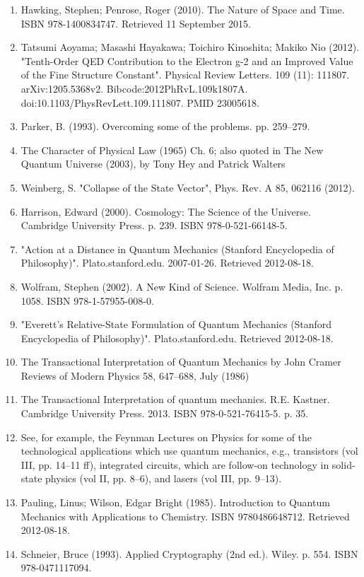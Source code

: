 \begin{enumerate}
\item Hawking, Stephen; Penrose, Roger (2010). The Nature of Space and Time. ISBN 978-1400834747. Retrieved 11 September 2015.
\item Tatsumi Aoyama; Masashi Hayakawa; Toichiro Kinoshita; Makiko Nio (2012). "Tenth-Order QED Contribution to the Electron g-2 and an Improved Value of the Fine Structure Constant". Physical Review Letters. 109 (11): 111807. arXiv:1205.5368v2. Bibcode:2012PhRvL.109k1807A. doi:10.1103/PhysRevLett.109.111807. PMID 23005618.
\item Parker, B. (1993). Overcoming some of the problems. pp. 259–279.
\item The Character of Physical Law (1965) Ch. 6; also quoted in The New Quantum Universe (2003), by Tony Hey and Patrick Walters
\item Weinberg, S. "Collapse of the State Vector", Phys. Rev. A 85, 062116 (2012).
\item Harrison, Edward (2000). Cosmology: The Science of the Universe. Cambridge University Press. p. 239. ISBN 978-0-521-66148-5.
\item "Action at a Distance in Quantum Mechanics (Stanford Encyclopedia of Philosophy)". Plato.stanford.edu. 2007-01-26. Retrieved 2012-08-18.
\item Wolfram, Stephen (2002). A New Kind of Science. Wolfram Media, Inc. p. 1058. ISBN 978-1-57955-008-0.
\item "Everett's Relative-State Formulation of Quantum Mechanics (Stanford Encyclopedia of Philosophy)". Plato.stanford.edu. Retrieved 2012-08-18.
\item The Transactional Interpretation of Quantum Mechanics by John Cramer Reviews of Modern Physics 58, 647–688, July (1986)
\item The Transactional Interpretation of quantum mechanics. R.E. Kastner. Cambridge University Press. 2013. ISBN 978-0-521-76415-5. p. 35.
\item See, for example, the Feynman Lectures on Physics for some of the technological applications which use quantum mechanics, e.g., transistors (vol III, pp. 14–11 ff), integrated circuits, which are follow-on technology in solid-state physics (vol II, pp. 8–6), and lasers (vol III, pp. 9–13).
\item Pauling, Linus; Wilson, Edgar Bright (1985). Introduction to Quantum Mechanics with Applications to Chemistry. ISBN 9780486648712. Retrieved 2012-08-18.
\item Schneier, Bruce (1993). Applied Cryptography (2nd ed.). Wiley. p. 554. ISBN 978-0471117094.

\end{enumerate}
